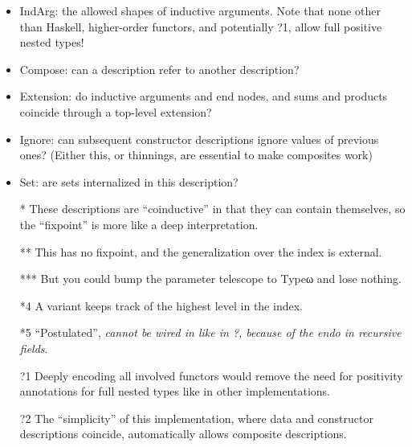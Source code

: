 \begin{itemize}
    \item IndArg: the allowed shapes of inductive arguments. Note that none other than Haskell, higher-order functors, and potentially ?1, allow full positive nested types!
    \item Compose: can a description refer to another description?
    \item Extension: do inductive arguments and end nodes, and sums and products coincide through a top-level extension?
    \item Ignore: can subsequent constructor descriptions ignore values of previous ones? (Either this, or thinnings, are essential to make composites work)
    \item Set: are sets internalized in this description?
\end{itemize}

\begin{itemize}
    \item[*] These descriptions are ``coinductive'' in that they can contain themselves, so the ``fixpoint'' is more like a deep interpretation.
    \item[**] This has no fixpoint, and the generalization over the index is external.
    \item[***] But you could bump the parameter telescope to Typeω and lose nothing.
    \item[*4] A variant keeps track of the highest level in the index.
    \item[*5] ``Postulated'', \emph{cannot be wired in like in ?, because of the endo in recursive fields}.
    \item[?1] Deeply encoding all involved functors would remove the need for positivity annotations for full nested types like in other implementations.
    \item[?2] The ``simplicity'' of this implementation, where data and constructor descriptions coincide, automatically allows composite descriptions.
\end{itemize}


